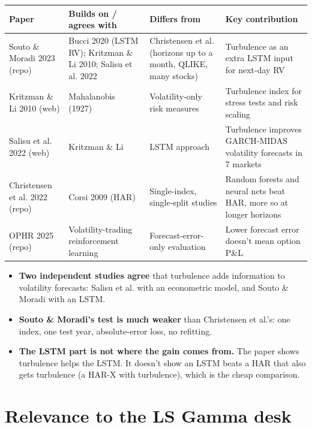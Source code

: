 \documentclass{article}
\begin{document}
\begin{center}\small
\begin{tabularx}{\linewidth}{>{\raggedright\arraybackslash}X >{\raggedright\arraybackslash}X >{\raggedright\arraybackslash}X >{\raggedright\arraybackslash}X}
\toprule
\textbf{Paper} & \textbf{Builds on /\allowbreak{} agrees with} & \textbf{Differs from} & \textbf{Key contribution} \\
\midrule
Souto \& Moradi 2023 (repo) & Bucci 2020 (LSTM RV); Kritzman \& Li 2010; Salisu et al. 2022 & Christensen et al. (horizons up to a month, QLIKE, many stocks) & Turbulence as an extra LSTM input for next-day RV \\
Kritzman \& Li 2010 (web) & Mahalanobis (1927) & Volatility-only risk measures & Turbulence index for stress tests and risk scaling \\
Salisu et al. 2022 (web) & Kritzman \& Li & LSTM approach & Turbulence improves GARCH-MIDAS volatility forecasts in 7 markets \\
Christensen et al. 2022 (repo) & Corsi 2009 (HAR) & Single-index, single-split studies & Random forests and neural nets beat HAR, more so at longer horizons \\
OPHR 2025 (repo) & Volatility-trading reinforcement learning & Forecast-error-only evaluation & Lower forecast error doesn't mean option P\&L \\
\bottomrule
\end{tabularx}
\end{center}

\begin{itemize}

\item \textbf{Two independent studies agree} that turbulence adds information to volatility forecasts: Salisu et al. with an econometric model, and Souto \& Moradi with an LSTM.

\item \textbf{Souto \& Moradi's test is much weaker} than Christensen et al.'s: one index, one test year, absolute-error loss, no refitting.

\item \textbf{The LSTM part is not where the gain comes from.} The paper shows turbulence helps the LSTM. It doesn't show an LSTM beats a HAR that also gets turbulence (a HAR-X with turbulence), which is the cheap comparison.

\end{itemize}

\section{Relevance to the LS Gamma desk}
\end{document}
